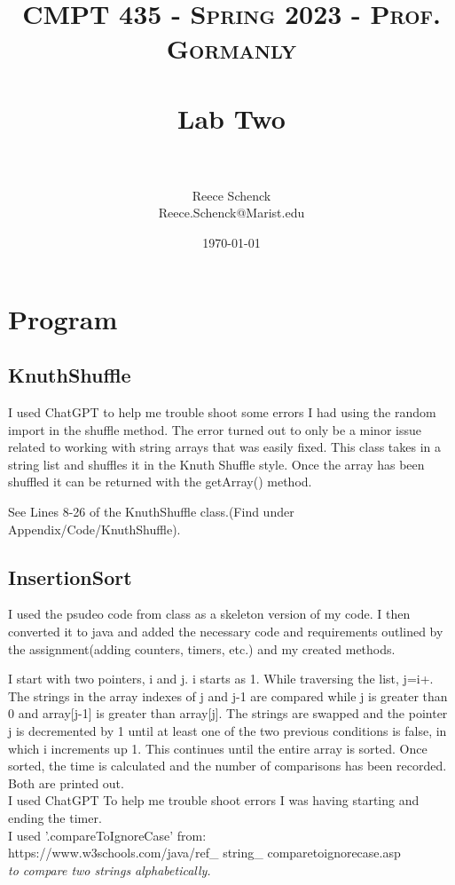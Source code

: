 \documentclass[10pt]{article}
\title{	
   \normalfont \normalsize 
   \textsc{CMPT 435 - Spring 2023 - Prof. Gormanly} \\[10pt] %
   \horrule{0.5pt} \\[0.25cm] 	%
   \huge Lab Two  \\     	    %
   \horrule{0.5pt} \\[0.25cm] 	%
}
\author{Reece Schenck \\ \normalsize Reece.Schenck@Marist.edu}
\date{\normalsize\today} 	%
\begin{document}
\maketitle %

\section{Program}

\subsection{KnuthShuffle}
I used ChatGPT to help me trouble shoot some errors I had using the random import in the shuffle method. 
The error turned out to only be a minor issue related to working with string arrays that was easily fixed.
This class takes in a string list and shuffles it in the Knuth Shuffle style.
Once the array has been shuffled it can be returned with the getArray() method.

See Lines 8-26 of the KnuthShuffle class.(Find under Appendix/Code/KnuthShuffle).

\subsection{InsertionSort}
I used the psudeo code from class as a skeleton version of my code. I then converted it to java and added the necessary code and requirements outlined by the assignment(adding counters, timers, etc.) and my created methods.

I start with two pointers, i and j. i starts as 1.
While traversing the list, j=i+. The strings in the array indexes of j and j-1 are compared while j is greater than 0 and array[j-1] is greater than array[j]. The strings are swapped and the pointer j is decremented by 1 until at least one of the two previous conditions is false, in which i increments up 1. This continues until the entire array is sorted. Once sorted, the time is calculated and the number of comparisons has been recorded. Both are printed out.
\\
\newline
I used ChatGPT To help me trouble shoot errors I was having starting and ending the timer.
\\
\newline
I used '.compareToIgnoreCase' from:
\\
https://www.w3schools.com/java/ref_ string_ comparetoignorecase.asp
\\
\emph{\normalfont to compare two strings alphabetically.}
\newline
\end{document}
